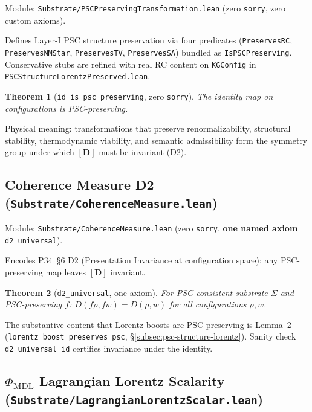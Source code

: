 \documentclass[11pt,a4paper]{article}
\newtheorem{theorem}{Theorem}[section]
\theoremstyle{definition}
\begin{document}
Module: \texttt{Substrate/PSCPreservingTransformation.lean} (zero
\lstinline|sorry|, zero custom axioms).

Defines Layer-I PSC structure preservation via four predicates
(\lstinline|PreservesRC|, \lstinline|PreservesNMStar|, \lstinline|PreservesTV|,
\lstinline|PreservesSA|) bundled as \lstinline|IsPSCPreserving|.
Conservative stubs are refined with real RC content on
\texttt{KGConfig} in \texttt{PSCStructureLorentzPreserved.lean}.

\begin{theorem}[\lstinline|id_is_psc_preserving|, zero \texttt{sorry}]
The identity map on configurations is PSC-preserving.
\end{theorem}

Physical meaning: transformations that preserve renormalizability, structural
stability, thermodynamic viability, and semantic admissibility form the
symmetry group under which $[\mathbf{D}]$ must be invariant (D2).

\subsection{Coherence Measure D2
  (\texttt{Substrate/CoherenceMeasure.lean})}\label{subsec:coherence-measure-d2}

Module: \texttt{Substrate/CoherenceMeasure.lean} (zero
\lstinline|sorry|, \textbf{one named axiom} \lstinline|d2_universal|).

Encodes P34~\S6 D2 (Presentation Invariance at configuration space):
any PSC-preserving map leaves $[\mathbf{D}]$ invariant.

\begin{theorem}[\lstinline|d2_universal|, one axiom]
For PSC-consistent substrate $\Sigma$ and PSC-preserving $f$:
$D(f\rho, fw) = D(\rho, w)$ for all configurations $\rho,w$.
\end{theorem}

The substantive content that Lorentz boosts are PSC-preserving is Lemma~2
(\lstinline|lorentz_boost_preserves_psc|, \S\ref{subsec:psc-structure-lorentz}).
Sanity check \lstinline|d2_universal_id| certifies invariance under the identity.

\subsection[$\Phi_{\mathrm{MDL}}$ Lagrangian Lorentz Scalarity (\texttt{LagrangianLorentzScalar.lean})]{$\Phi_{\mathrm{MDL}}$ Lagrangian Lorentz Scalarity
  (\texttt{Substrate/\allowbreak LagrangianLorentzScalar.lean})}\label{subsec:lagrangian-lorentz-scalar}
\end{document}
